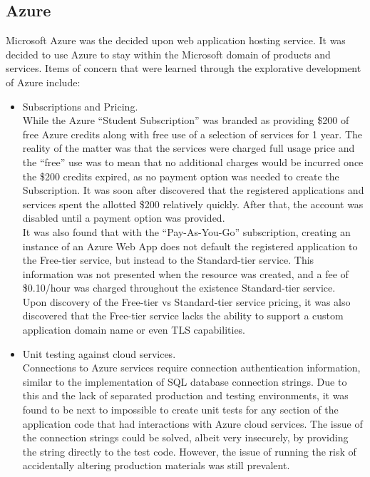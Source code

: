 
\subsection{Azure}
Microsoft Azure was the decided upon web application hosting service.  
It was decided to use Azure to stay within the Microsoft domain of products and services.
Items of concern that were learned through the explorative development of Azure include:
\begin{itemize}
    \item Subscriptions and Pricing.\\

    While the Azure ``Student Subscription'' was branded as providing \$200 of free Azure credits along with free use of a selection of services for 1 year. 
    The reality of the matter was that the services were charged full usage price and the ``free'' use was to mean that no additional charges would be incurred once the \$200 credits expired, as no payment option was needed to create the Subscription. 
    It was soon after discovered that the registered applications and services spent the allotted \$200 relatively quickly. 
    After that, the account was disabled until a payment option was provided.\\

    It was also found that with the ``Pay-As-You-Go'' subscription, creating an instance of an Azure Web App does not default the registered application to the Free-tier service, but instead to the Standard-tier service.  
    This information was not presented when the resource was created, and a fee of \$0.10/hour was charged throughout the existence Standard-tier service.\\

    Upon discovery of the Free-tier vs Standard-tier service pricing, it was also discovered that the Free-tier service lacks the ability to support a custom application domain name or even TLS capabilities.\\

    \item Unit testing against cloud services.\\

    Connections to Azure services require connection authentication information, similar to the implementation of SQL database connection strings.  
    Due to this and the lack of separated production and testing environments, it was found to be next to impossible to create unit tests for any section of the application code that had interactions with Azure cloud services.  
    The issue of the connection strings could be solved, albeit very insecurely, by providing the string directly to the test code. 
    However, the issue of running the risk of accidentally altering production materials was still prevalent.\\


\end{itemize}
